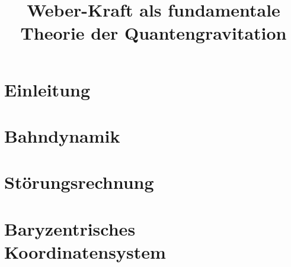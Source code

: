 \documentclass{book}
\title{Weber-Kraft als fundamentale Theorie der Quantengravitation}
\author{}
\date{}
\begin{document}
\maketitle
\tableofcontents
\chapter{Einleitung}

















\chapter{Bahndynamik}










\chapter{Störungsrechnung}






\chapter{Baryzentrisches Koordinatensystem}




\end{document}
